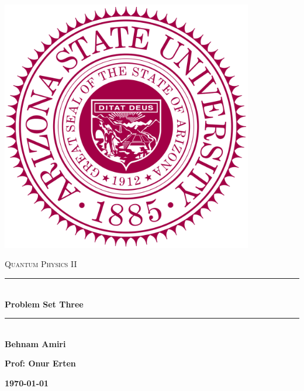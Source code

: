 \documentclass[fleqn]{article}
\begin{document}
  \begin{titlepage}

    \newcommand{\HRule}{\rule{\linewidth}{0.5mm}}

    \center

    \begin{center}
      \includegraphics[height=11cm, width=11cm]{asu.png}
    \end{center}

    \vline

    \textsc{\LARGE Quantum Physics II}\\[1.5cm]

    \HRule \\[0.5cm]
    { \huge \bfseries Problem Set Three}\\[0.4cm] 
    \HRule \\[1.0cm]

    \textbf{Behnam Amiri}

    \bigbreak

    \textbf{Prof: Onur Erten}

    \bigbreak

    \textbf{{\large \today}\\[2cm]}

    \vfill

  \end{titlepage}
\end{document}
